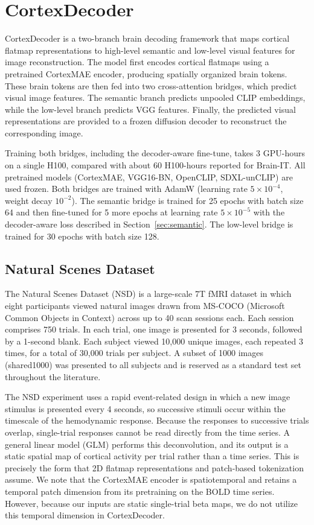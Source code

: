 \documentclass[letterpaper]{article} %
\begin{document}
\section{CortexDecoder}
\label{sec:cortex_decoder}
CortexDecoder is a two-branch brain decoding framework that maps cortical flatmap representations to high-level semantic and low-level visual features for image reconstruction. The model first encodes cortical flatmaps using a pretrained CortexMAE encoder, producing spatially organized brain tokens. These brain tokens are then fed into two cross-attention bridges, which predict visual image features. The semantic branch predicts unpooled CLIP embeddings, while the low-level branch predicts VGG features. Finally, the predicted visual representations are provided to a frozen diffusion decoder to reconstruct the corresponding image.

Training both bridges, including the decoder-aware fine-tune, takes 3 GPU-hours on a single H100, compared with about 60 H100-hours reported for Brain-IT. All pretrained models (CortexMAE, VGG16-BN, OpenCLIP, SDXL-unCLIP) are used frozen. Both bridges are trained with AdamW (learning rate $5\times10^{-4}$, weight decay $10^{-2}$). The semantic bridge is trained for 25 epochs with batch size 64 and then fine-tuned for 5 more epochs at learning rate $5\times10^{-5}$ with the decoder-aware loss described in Section~\ref{sec:semantic}. The low-level bridge is trained for 30 epochs with batch size 128.

\subsection{Natural Scenes Dataset}
The Natural Scenes Dataset (NSD) is a large-scale 7T fMRI dataset in which eight participants viewed natural images drawn from MS-COCO (Microsoft Common Objects in Context) \cite{lin2015microsoftcococommonobjects} across up to 40 scan sessions each. Each session comprises 750 trials. In each trial, one image is presented for 3 seconds, followed by a 1-second blank. Each subject viewed 10,000 unique images, each repeated 3 times, for a total of 30,000 trials per subject. A subset of 1000 images (shared1000) was presented to all subjects and is reserved as a standard test set throughout the literature.

The NSD experiment uses a rapid event-related design in which a new image stimulus is presented every 4 seconds, so successive stimuli occur within the timescale of the hemodynamic response. Because the responses to successive trials overlap, single-trial responses cannot be read directly from the time series. A general linear model (GLM) \cite{10.7554/eLife.77599} performs this deconvolution, and its output is a static spatial map of cortical activity per trial rather than a time series. This is precisely the form that 2D flatmap representations and patch-based tokenization assume. We note that the CortexMAE encoder is spatiotemporal and retains a temporal patch dimension from its pretraining on the BOLD time series. However, because our inputs are static single-trial beta maps, we do not utilize this temporal dimension in CortexDecoder.
\end{document}
